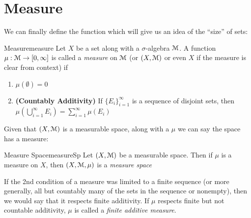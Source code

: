 \documentclass[oneside]{book}
\newcommand{\MM}{\EuScript{M}}
\renewcommand{\bf}[1]{\textbf{#1}}
\newcommand{\rw}{\rightarrow}
\begin{document}
\section{Measure}

We can finally define the function which will give us an idea of the ``size'' of sets:

\begin{defn}{Measure}{measure}
	Let $X$ be a set along with a $\sigma$-algebra $\MM$. A function $\mu: \MM \rw [0,\infty]$ is called
	a \emph{measure} on $\MM$ (or $(X, \MM)$ or even $X$ if the measure is clear from context) if
	\begin{enumerate}
		\item $\mu(\emptyset) = 0$
		\item \bf{(Countably Additivity)} If $\{E_i\}_{i=1}^\infty$ is a sequence of disjoint sets, then
			$\mu\left(\bigcup_{i=1}^\infty E_i\right) = \sum_{i=1}^\infty \mu(E_i)$ 
	\end{enumerate}

\end{defn}

Given that $(X, \MM)$ is a measurable space, along with a $\mu$ we can say the space has a measure:

\begin{defn}{Measure Space}{measureSp}
	Let $(X, \MM)$ be a measurable space. Then if $\mu$ is a measure on $X$, then $(X, \MM, \mu)$ is a \emph{measure
	space}
\end{defn}

If the 2nd condition of a measure was limited to a finite sequence (or more generally, all but countably many of the sets in the
sequence or nonempty), then we would say that it respects finite additivity. If $\mu$ respects finite but not countable
additivity, $\mu$ is called a \emph{finite additive measure}. 
\end{document}
